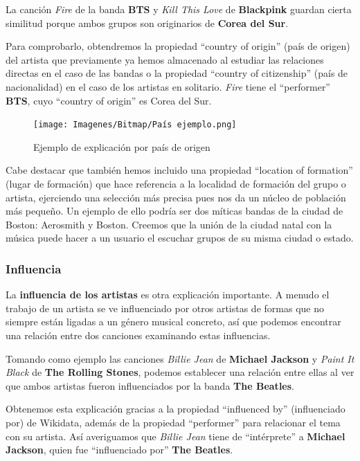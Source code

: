 La canción \textit{Fire} de la banda \textbf{BTS} y \textit{Kill This Love} de \textbf{Blackpink} guardan cierta similitud porque ambos grupos son originarios de \textbf{Corea del Sur}.

Para comprobarlo, obtendremos la propiedad ``country of origin'' (país de origen) del artista que previamente ya hemos almacenado al estudiar las relaciones directas en el caso de las bandas o la propiedad ``country of citizenship'' (país de nacionalidad) en el caso de los artistas en solitario. \textit{Fire} tiene el ``performer'' \textbf{BTS}, cuyo ``country of origin'' es Corea del Sur.

\begin{figure}[h!]
	\centering
	\texttt{[image: Imagenes/Bitmap/País ejemplo.png]}
	\caption{Ejemplo de explicación por país de origen}
	\label{fig:sampleImage}
\end{figure}

Cabe destacar que también hemos incluido una propiedad ``location of formation'' (lugar de formación) que hace referencia a la localidad de formación del grupo o artista, ejerciendo una selección más precisa pues nos da un núcleo de población más pequeño. Un ejemplo de ello podría ser dos míticas bandas de la ciudad de Boston: Aerosmith y Boston. Creemos que la unión de la ciudad natal con la música puede hacer a un usuario el escuchar grupos de su misma ciudad o estado.


\subsubsection*{Influencia}

La \textbf{influencia de los artistas} es otra explicación importante. A menudo el trabajo de un artista se ve influenciado por otros artistas de formas que no siempre están ligadas a un género musical concreto, así que podemos encontrar una relación entre dos canciones examinando estas influencias.

Tomando como ejemplo las canciones \textit{Billie Jean} de \textbf{Michael Jackson} y \textit{Paint It Black} de \textbf{The Rolling Stones}, podemos establecer una relación entre ellas al ver que ambos artistas fueron influenciados por la banda \textbf{The Beatles}.

Obtenemos esta explicación gracias a la propiedad ``influenced by'' (influenciado por) de Wikidata, además de la propiedad ``performer'' para relacionar el tema con su artista. Así averiguamos que \textit{Billie Jean} tiene de ``intérprete'' a \textbf{Michael Jackson}, quien fue ``influenciado por'' \textbf{The Beatles}.


